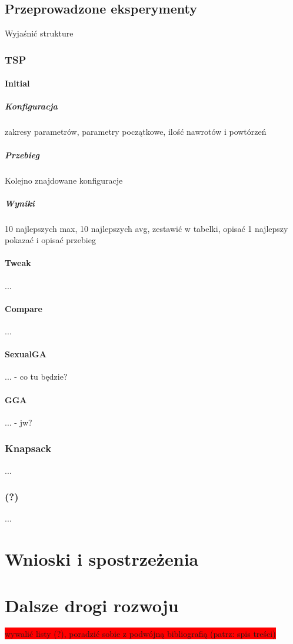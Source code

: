 \documentclass[twoside]{iisthesis}
\newcommand{\todo}{\colorbox{red}}
\begin{document}
\section{Przeprowadzone eksperymenty}
Wyjaśnić strukture
\subsection{TSP}
\subsubsection{Initial}
\paragraph{Konfiguracja}
zakresy parametrów, parametry początkowe, ilość nawrotów i powtórzeń
\paragraph{Przebieg}
Kolejno znajdowane konfiguracje
\paragraph{Wyniki}
10 najlepszych max, 10 najlepszych avg, zestawić w tabelki, opisać
1 najlepszy pokazać i opisać przebieg
\subsubsection{Tweak}
...
\subsubsection{Compare}
...
\subsubsection{SexualGA}
... - co tu będzie?
\subsubsection{GGA}
... - jw?
\subsection{Knapsack}
...
\subsection{(?)}
...

\chapter{Wnioski i spostrzeżenia}
\chapter{Dalsze drogi rozwoju}



\pagestyle{plain}

\todo{wywalić listy (?), poradzić sobie z podwójną bibliografią (patrz: spis treści)}

\listoffigures
\listoftables
{}



\end{document}
